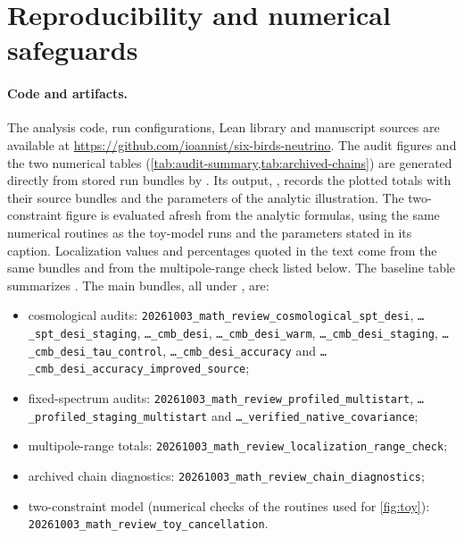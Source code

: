 \section{Reproducibility and numerical safeguards}
\label{app:reproducibility}

\paragraph{Code and artifacts.}
The analysis code, run configurations, Lean library and manuscript sources are available at \url{https://github.com/ioannist/six-birds-neutrino}. The audit figures and the two numerical tables (\cref{tab:audit-summary,tab:archived-chains}) are generated directly from stored run bundles by . Its output, , records the plotted totals with their source bundles and the parameters of the analytic illustration. The two-constraint figure is evaluated afresh from the analytic formulas, using the same numerical routines as the toy-model runs and the parameters stated in its caption. Localization values and percentages quoted in the text come from the same bundles and from the multipole-range check listed below. The baseline table summarizes \cite{arxiv2601_16277}. The main bundles, all under , are:
\begin{itemize}[leftmargin=*, itemsep=1pt]
  \item cosmological audits: \texttt{20261003\_\allowbreak{}math\_\allowbreak{}review\_\allowbreak{}cosmological\_\allowbreak{}spt\_\allowbreak{}desi}, \texttt{\dots\_\allowbreak{}spt\_\allowbreak{}desi\_\allowbreak{}staging}, \texttt{\dots\_\allowbreak{}cmb\_\allowbreak{}desi}, \texttt{\dots\_\allowbreak{}cmb\_\allowbreak{}desi\_\allowbreak{}warm}, \texttt{\dots\_\allowbreak{}cmb\_\allowbreak{}desi\_\allowbreak{}staging}, \texttt{\dots\_\allowbreak{}cmb\_\allowbreak{}desi\_\allowbreak{}tau\_\allowbreak{}control}, \texttt{\dots\_\allowbreak{}cmb\_\allowbreak{}desi\_\allowbreak{}accuracy} and \texttt{\dots\_\allowbreak{}cmb\_\allowbreak{}desi\_\allowbreak{}accuracy\_\allowbreak{}improved\_\allowbreak{}source};
  \item fixed-spectrum audits: \texttt{20261003\_\allowbreak{}math\_\allowbreak{}review\_\allowbreak{}profiled\_\allowbreak{}multistart}, \texttt{\dots\_\allowbreak{}profiled\_\allowbreak{}staging\_\allowbreak{}multistart} and \texttt{\dots\_\allowbreak{}verified\_\allowbreak{}native\_\allowbreak{}covariance};
  \item multipole-range totals: \texttt{20261003\_\allowbreak{}math\_\allowbreak{}review\_\allowbreak{}localization\_\allowbreak{}range\_\allowbreak{}check};
  \item archived chain diagnostics: \texttt{20261003\_\allowbreak{}math\_\allowbreak{}review\_\allowbreak{}chain\_\allowbreak{}diagnostics};
  \item two-constraint model (numerical checks of the routines used for \cref{fig:toy}): \texttt{20261003\_\allowbreak{}math\_\allowbreak{}review\_\allowbreak{}toy\_\allowbreak{}cancellation}.
\end{itemize}
